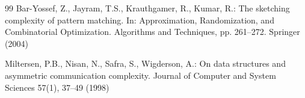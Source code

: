 \documentclass[10pt,a4paper]{article}
\begin{document}
\begin{thebibliography}{99}
Bar-Yossef, Z., Jayram, T.S., Krauthgamer, R., Kumar, R.: The sketching
  complexity of pattern matching. In: Approximation, Randomization, and
  Combinatorial Optimization. Algorithms and Techniques, pp. 261--272. Springer
  (2004)

Miltersen, P.B., Nisan, N., Safra, S., Wigderson, A.: On data structures and
  asymmetric communication complexity. Journal of Computer and System Sciences
  57(1),  37--49 (1998)

\end{thebibliography}
\end{document}
